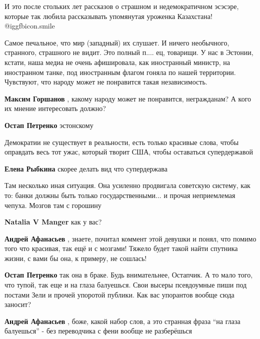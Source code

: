 \begin{itemize}
И это после стольких лет рассказов о страшном и недемократичном эсэсэре,
которые так любила рассказывать упомянутая уроженка Казахстана!  @igg{fbicon.smile} 


Самое печальное, что мир (западный) их слушает. И ничего необычного, странного,
страшного не видит. Это полный п.... ец, товарищи. У нас в Эстонии, кстати, наша
медиа не очень афишировала, как иностранный министр, на иностранном танке, под
иностранным флагом гоняла по нашей территории. Чувствуют, что народу может не
понравится такая независимость.

\begin{itemize} %
\textbf{Максим Горшанов} , какому народу может не понравится, негражданам? А кого их мнение интересовать должно?

\textbf{Остап Петренко} эстонскому
\end{itemize} %


Демократии не существует в реальности, есть только красивые слова, чтобы
оправдать весь тот ужас, который творит США, чтобы оставаться супердержавой

\begin{itemize} %
\textbf{Елена Рыбкина} скорее делать вид что супердержава
\end{itemize} %


Там несколько иная ситуация. Она усиленно продвигала советскую систему, как то:
банки должны быть только государственными... и прочая неприемлемая чепуха. Мозгов
там с горошину

\begin{itemize} %
\textbf{Natalia V Manger} как у вас?

\textbf{Андрей Афанасьев} , знаете, почитал коммент этой девушки и понял, что помимо того что красивая, так ещё и с мозгами! Тяжело будет такой найти спутника жизни, с вами бы она, к примеру, не сошлась!

\textbf{Остап Петренко} так она в браке. Будь внимательнее, Остапчик. А то мало того, что тупой, так еще и на глаза балуешься. Свои высеры псевдоумные пиши под постами Зели и прочей упоротой публики. Как вас упорантов вообще сюда заносит?

\textbf{Андрей Афанасьев} , боже, какой набор слов, а это странная фраза \enquote{на глаза балуешься} - без переводчика с фени вообще не разберёшься


\end{itemize}
\end{itemize}
